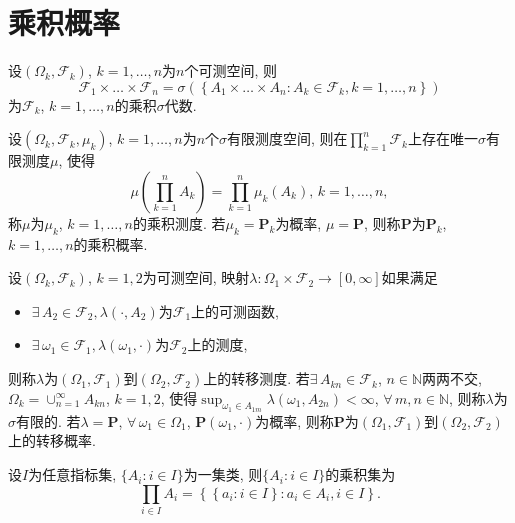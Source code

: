 \chapter{乘积概率}

\def\F{\mathcal{F}}
\def\s{$(\Omega,\F,\mu)$}
\def\R{\mathbb{R}}
\def\P{\mathbf{P}}
\begin{definition}
    设$(\Omega_k,\F_k)$, $k=1,\dots,n$为$n$个可测空间, 则
    \begin{equation}
        \F_1\times\dots\times\F_n=\sigma(\left\{A_1\times\dots\times A_n:A_k\in\F_k,k=1,\dots,n\right\})
    \end{equation}
    为$\F_k$, $k=1,\dots,n$的乘积$\sigma$代数.
\end{definition}

\begin{definition}
    设$(\Omega_k,\F_k,\mu_k)$, $k=1,\dots,n$为$n$个$\sigma$有限测度空间, 则在$\prod_{k=1}^{n}\F_k$上存在唯一$\sigma$有限测度$\mu$, 使得
    \begin{equation}
        \mu(\prod_{k=1}^{n}A_k)=\prod_{k=1}^{n}\mu_k(A_k),\,k=1,\dots,n,
    \end{equation}
    称$\mu$为$\mu_k$, $k=1,\dots,n$的乘积测度. 若$\mu_k=\P_k$为概率, $\mu=\P$, 则称$\P$为$\P_k$, $k=1,\dots,n$的乘积概率.
\end{definition}

\begin{definition}
    设$(\Omega_k,\F_k)$, $k=1,2$为可测空间, 映射$\lambda:\Omega_1\times\F_2\to[0,\infty]$如果满足
    \begin{itemize}
        \item $\exists\, A_2\in\F_2, \lambda(\cdot,A_2)$为$\F_1$上的可测函数,
        \item $\exists\, \omega_1\in\F_1, \lambda(\omega_1,\cdot)$为$\F_2$上的测度,
    \end{itemize}
    则称$\lambda$为$(\Omega_1,\F_1)$到$(\Omega_2,\F_2)$上的转移测度. 若$\exists\, A_{kn}\in\F_k$, $n\in\mathbb{N}$两两不交, $\Omega_k=\cup_{n=1}^{\infty}A_{kn}$, $k=1,2$, 使得$\sup_{\omega_1\in A_{1m}}\lambda(\omega_1,A_{2n})<\infty$, $\forall\, m,n\in\mathbb{N}$, 则称$\lambda$为$\sigma$有限的. 若$\lambda=\P$, $\forall\, \omega_1\in\Omega_1$, $\P(\omega_1,\cdot)$为概率, 则称$\P$为$(\Omega_1,\F_1)$到$(\Omega_2,\F_2)$上的转移概率.
\end{definition}

\begin{definition}
    设$I$为任意指标集, $\{A_i:i\in I\}$为一集类, 则$\{A_i:i\in I\}$的乘积集为
    \begin{equation}
        \prod_{i\in I}A_i=\left\{\left\{a_{i}:i\in I\right\}:a_{i}\in A_i,i\in I\right\}.
    \end{equation}
\end{definition}

